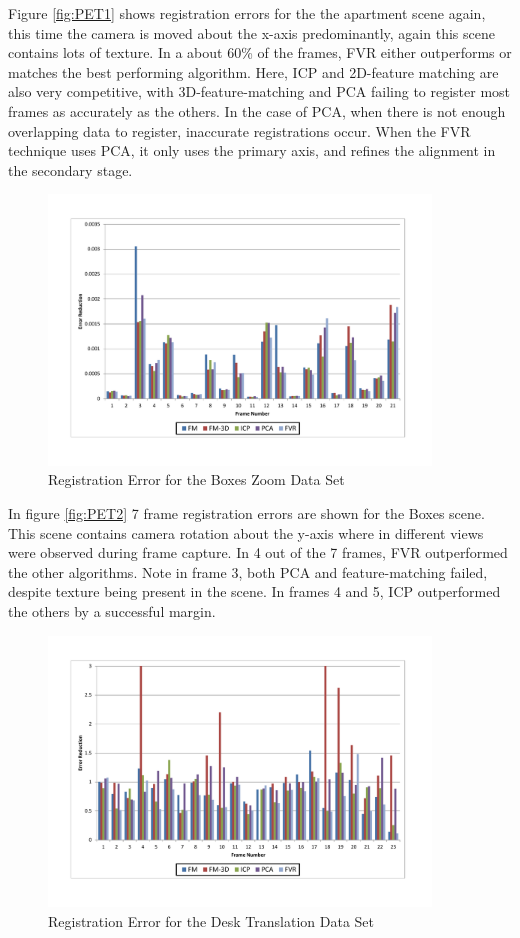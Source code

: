 Figure \ref{fig:PET1} shows registration errors for the the apartment scene again, this time the camera is moved about the x-axis predominantly, again this scene contains lots of texture. In a about 60\% of the frames, FVR either outperforms or matches the best performing algorithm. Here, ICP and 2D-feature matching are also very competitive, with 3D-feature-matching and PCA failing to register most frames as accurately as the others. In the case of PCA, when there is not enough overlapping data to register, inaccurate registrations occur. When the FVR technique uses PCA, it only uses the primary axis, and refines the alignment in the secondary stage. \\

\begin{figure}[!htb]
\centering
\includegraphics[width=4.0in]{images/results/Boxes_Texture_ZoomOut}
\caption{Registration Error for the Boxes Zoom Data Set}
\label{fig:PET3}
\end{figure}

In figure \ref{fig:PET2} 7 frame registration errors are shown for the Boxes scene. This scene contains camera rotation about the y-axis where in different views were observed during frame capture. In 4 out of the 7 frames, FVR outperformed the other algorithms. Note in frame 3, both PCA and feature-matching failed, despite texture being present in the scene. In frames 4 and 5, ICP outperformed the others by a successful margin.  \\

\begin{figure}[!htb]
\centering
\includegraphics[width=4.0in]{images/results/Desk_Texture_Translation}
\caption{Registration Error for the Desk Translation Data Set}
\label{fig:PET4}
\end{figure}

